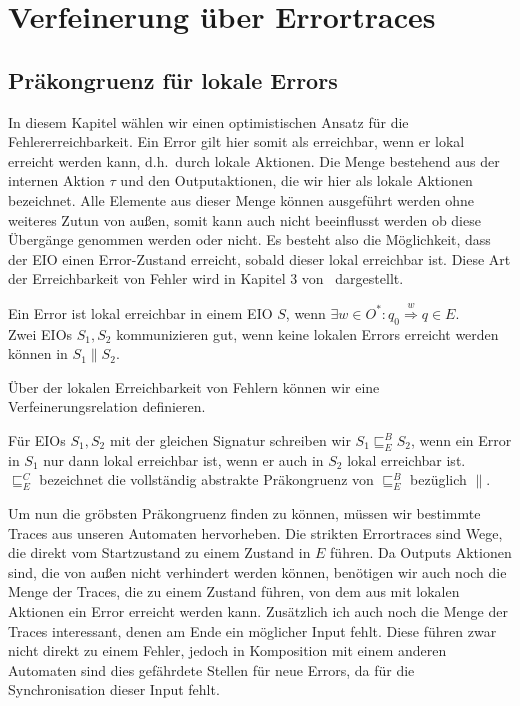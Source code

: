 \chapter{Verfeinerung über Errortraces}

\section{Präkongruenz für lokale Errors}
In diesem Kapitel wählen wir einen optimistischen Ansatz für die Fehlererreichbarkeit. Ein Error gilt hier somit als erreichbar, wenn er lokal
erreicht werden kann, d.h.\ durch lokale Aktionen. Die Menge bestehend aus der
internen Aktion $\tau$ und den Outputaktionen, die wir hier als lokale Aktionen
bezeichnet. Alle Elemente aus dieser Menge können ausgeführt werden ohne
weiteres Zutun von außen, somit kann auch nicht beeinflusst werden ob diese
Übergänge genommen werden oder nicht. Es besteht also die Möglichkeit, dass
der EIO einen Error-Zustand erreicht, sobald dieser lokal erreichbar ist. Diese
Art der Erreichbarkeit von Fehler wird in Kapitel 3 von~\cite{Vogler2014EIO}
dargestellt.

\begin{Def}
  Ein Error ist lokal erreichbar in einem EIO $S$, wenn $\exists w\in O^*: q_0
  \overset{w}{\Rightarrow} q\in E$.\\
  Zwei EIOs $S_1, S_2$ kommunizieren gut, wenn keine lokalen Errors erreicht
  werden können in $S_1\| S_2$.
\end{Def}

Über der lokalen Erreichbarkeit von Fehlern können wir eine
Verfeinerungsrelation definieren.

\begin{Def}
  Für EIOs $S_1, S_2$ mit der gleichen Signatur schreiben wir $S_1\sqsubseteq
  _E^ B S_2$, wenn ein Error in $S_1$ nur dann lokal erreichbar ist, wenn er
  auch in $S_2$ lokal erreichbar ist.\\
  $\sqsubseteq _E^C$ bezeichnet die vollständig abstrakte Präkongruenz von
  $\sqsubseteq _E^B$ bezüglich $\|$.
\end{Def}

Um nun die gröbsten Präkongruenz finden zu können, müssen wir bestimmte Traces
aus unseren Automaten hervorheben. Die strikten Errortraces sind Wege, die
direkt vom Startzustand zu einem Zustand in $E$ führen. Da Outputs Aktionen
sind, die von außen nicht verhindert werden können, benötigen wir auch noch die
Menge der Traces, die zu einem Zustand führen, von dem aus mit lokalen Aktionen
ein Error erreicht werden kann. Zusätzlich ich auch noch die Menge der Traces
interessant, denen am Ende ein möglicher Input fehlt. Diese führen zwar nicht
direkt zu einem Fehler, jedoch in Komposition mit einem anderen Automaten sind
dies gefährdete Stellen für neue Errors, da für die Synchronisation dieser Input
fehlt.

